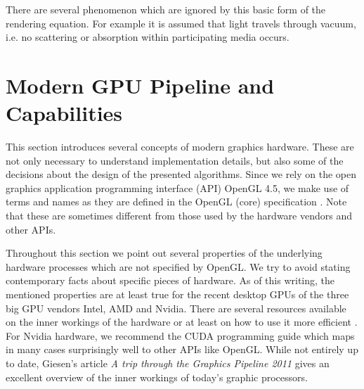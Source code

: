 \documentclass[thesis.tex]{subfiles}
\begin{document}
There are several phenomenon which are ignored by this basic form of the rendering equation.
For example it is assumed that light travels through vacuum, i.e. no scattering or absorption within participating media occurs.



\section{Modern GPU Pipeline and Capabilities} \label{sec:preq:gpu}
This section introduces several concepts of modern graphics hardware.
These are not only necessary to understand implementation details, but also some of the decisions about the design of the presented algorithms.
Since we rely on the open graphics application programming interface (API) OpenGL 4.5, we make use of terms and names as they are defined in the OpenGL (core) specification \cite{bib:openglspec}.
Note that these are sometimes different from those used by the hardware vendors and other APIs.

Throughout this section we point out several properties of the underlying hardware processes which are not specified by OpenGL.
We try to avoid stating contemporary facts about specific pieces of hardware.
As of this writing, the mentioned properties are at least true for the recent desktop GPUs of the three big GPU vendors Intel, AMD and Nvidia.
There are several resources available on the inner workings of the hardware or at least on how to use it more efficient \cite{bib:intelhardwaredoc, bib:amdhardwaredoc}.
For Nvidia hardware, we recommend the CUDA programming guide \cite{bib:cudaprogguide} which maps in many cases surprisingly well to other APIs like OpenGL.
While not entirely up to date, Giesen's article \emph{A trip through the Graphics Pipeline 2011} \cite{bib:tripthroughgraphicspipe} gives an excellent overview of the inner workings of today's graphic processors.

\end{document}
